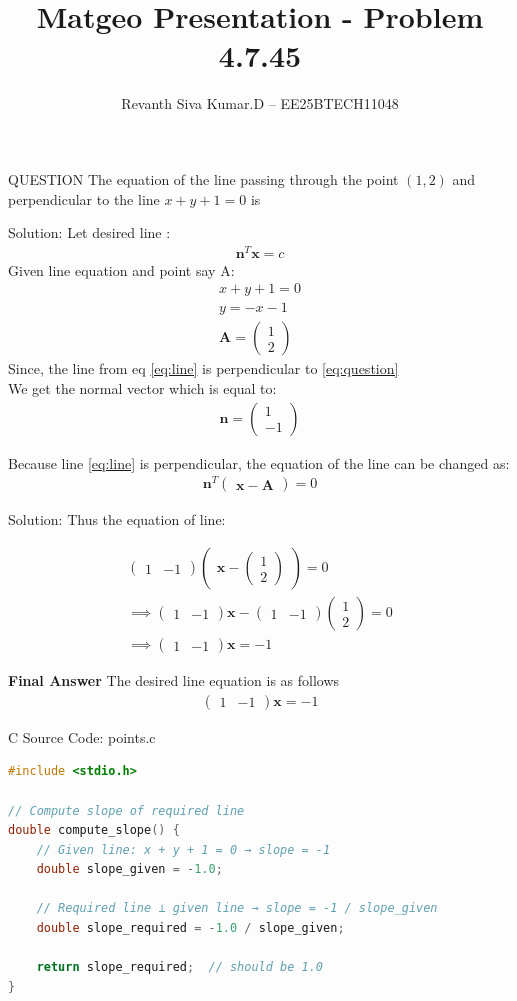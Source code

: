 \documentclass{beamer}
\title{Matgeo Presentation - Problem 4.7.45}
\author{Revanth Siva Kumar.D -- EE25BTECH11048}
\numberwithin{equation}{section}
\newcommand{\myvec}[1]{\ensuremath{\begin{pmatrix}#1\end{pmatrix}}}
\let\vec\mathbf
\begin{document}
\begin{frame}
\titlepage
\end{frame}

\begin{frame}{QUESTION}
The equation of the line passing through the point $(1, 2)$ and perpendicular to the line $x + y + 1 = 0$ is\end{frame}

\begin{frame}{Solution:}
Let desired line :
\begin{align}
    \vec{n}^T\vec{x}=c
    \label{eq:question}
\end{align}
Given line equation and point say A:
\begin{align}
    x+y+1=0
    \label{eq:line}\\
    y=-x-1\\
    \vec{A}=\myvec{1\\2}
\end{align}
Since, the line from eq \eqref{eq:line} is perpendicular to \eqref{eq:question} \\
We get the normal vector which is equal to:
\begin{align}
   \vec{n} =\myvec{1\\-1}
\end{align}

Because line \eqref{eq:line} is perpendicular, the equation of the line can be changed as:
\begin{align}
    \vec{n}^T\myvec{\vec{x} - \vec{A}}=0
\end{align}
\end{frame}
\begin{frame}{Solution:}
Thus the equation of line:

\begin{align}
    \myvec{1&-1}\myvec{\vec{x} - \myvec{1\\2}}=0\\
    \implies  \myvec{1&-1}\vec{x}-\myvec{1&-1}\myvec{1\\2}=0\\
    \implies \myvec{1&-1}\vec{x}=-1
\end{align}

\textbf{Final Answer}
The desired line equation is as follows
\begin{align*}
    \myvec{1&-1}\vec{x}=-1
\end{align*}
\end{frame}
\begin{frame}[fragile]{C Source Code: points.c}
\begin{lstlisting}[language=C]
#include <stdio.h>

// Compute slope of required line
double compute_slope() {
    // Given line: x + y + 1 = 0 → slope = -1
    double slope_given = -1.0;

    // Required line ⟂ given line → slope = -1 / slope_given
    double slope_required = -1.0 / slope_given;

    return slope_required;  // should be 1.0
}

\end{lstlisting}
\end{frame}
\end{document}
